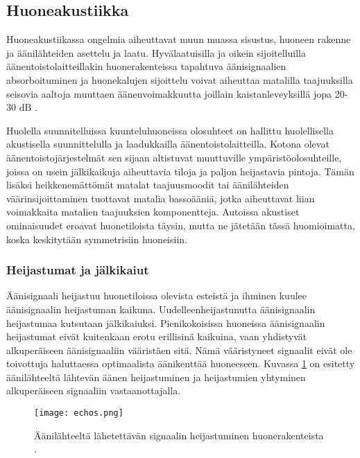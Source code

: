 \documentclass[finnish,12pt]{article}
\begin{document}
\subsection{Huoneakustiikka}

Huoneakustiikassa ongelmia aiheuttavat muun muassa sisustus, huoneen rakenne ja äänilähteiden asettelu ja laatu. Hyvälaatuisilla ja oikein sijoitelluilla äänentoistolaitteillakin huonerakenteissa tapahtuva äänisignaalien absorboituminen ja huonekalujen sijoittelu voivat aiheuttaa matalilla taajuuksilla seisovia aaltoja muuttaen äänenvoimakkuutta joillain kaistanleveyksillä jopa 20-30 dB  \cite{CBean1989}.

Huolella suunnitelluissa kuunteluhuoneissa olosuhteet on hallittu huolellisella akustisella suunnittelulla ja laadukkailla äänentoistolaitteilla. Kotona olevat äänentoistojärjestelmät sen sijaan altistuvat muuttuville ympäristöolosuhteille, joissa on usein jälkikaikuja aiheuttavia tiloja ja paljon heijastavia pintoja. Tämän lisäksi heikkenemättömät matalat taajuusmoodit tai äänilähteiden väärinsijoittaminen tuottavat matalia bassoääniä, jotka aiheuttavat liian voimakkaita matalien taajuuksien komponentteja. Autoissa akustiset ominaisuudet eroavat huonetiloista täysin, mutta ne jätetään tässä huomioimatta, koska keskitytään symmetrisiin huoneisiin. \cite{MKarjalainen2005}

\subsubsection{Heijastumat ja jälkikaiut}

Äänisignaali heijastuu huonetiloissa olevista esteistä ja ihminen kuulee äänisignaalin heijastuman kaikuna. Uudelleenheijastunutta äänisignaalin heijastumaa kutsutaan jälkikaiuksi. Pienikokoisissa huoneissa äänisignaalin heijastumat eivät kuitenkaan erotu erillisinä kaikuina, vaan yhdistyvät alkuperäiseen äänisignaaliin vääristäen sitä. Nämä vääristyneet signaalit eivät ole toivottuja haluttaessa optimaalista äänikenttää huoneeseen. Kuvassa \ref{fig:echos in room} on esitetty äänilähteeltä lähtevän äänen heijastuminen ja heijastumien yhtyminen alkuperäiseen signaaliin vastaanottajalla.

\begin{figure}[h!]
	\centering
	\texttt{[image: echos.png]}
	\caption{Äänilähteeltä lähetettävän signaalin heijastuminen huonerakenteista \cite{YHaneda1994}.}
	\label{fig:echos in room}
\end{figure}
\end{document}

